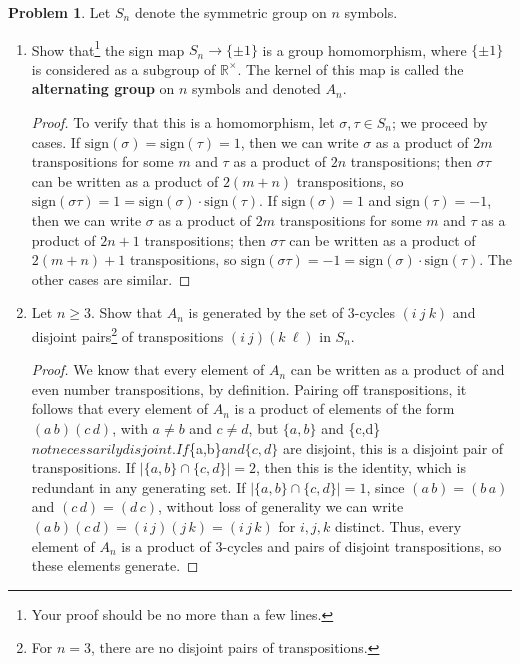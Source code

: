\documentclass[11pt]{article}
\theoremstyle{definition}
\newtheorem{problem}{Problem}
\begin{document}
\begin{problem} 
Let $S_n$ denote the symmetric group on $n$ symbols.
\begin{enumerate}[(3.1)]
\item Show that\footnote{Your proof should be no more than a few lines.} the sign map $S_n \to \{\pm 1\}$ is a group homomorphism, where $\{\pm 1\}$ is considered as a subgroup of $\mathbb{R}^\times$. The kernel of this map is called the \textbf{alternating group} on $n$ symbols and denoted $A_n$.

\begin{proof} To verify that this is a homomorphism, let $\sigma, \tau\in S_n$; we proceed by cases. If $\mathrm{sign}(\sigma) = \mathrm{sign}(\tau)= 1$, then we can write $\sigma$ as a product of $2m$ transpositions for some $m$ and $\tau$ as a product of $2n$ transpositions; then $\sigma \tau$ can be written as a product of $2(m+n)$ transpositions, so $\mathrm{sign}(\sigma\tau) = 1 = \mathrm{sign}(\sigma) \cdot \mathrm{sign}(\tau)$. If $\mathrm{sign}(\sigma) = 1$ and $\mathrm{sign}(\tau)=-1$, then  we can write $\sigma$ as a product of $2m$ transpositions for some $m$ and $\tau$ as a product of $2n+1$ transpositions; then $\sigma \tau$ can be written as a product of $2(m+n)+1$ transpositions, so $\mathrm{sign}(\sigma\tau) = -1 = \mathrm{sign}(\sigma) \cdot \mathrm{sign}(\tau)$. The other cases are similar.
\end{proof}




\item Let $n\geq 3$. Show that $A_n$ is generated by the set of $3$-cycles $(i \ j\ k)$ and disjoint pairs\footnote{For $n=3$, there are no disjoint pairs of transpositions.} of transpositions $(i \ j) (k \ \ell)$ in $S_n$. 

\begin{proof} 
We know that every element of $A_n$ can be written as a product of and even number transpositions, by definition. Pairing off transpositions, it follows that every element of $A_n$ is a product of elements of the form $(a\, b)(c\, d)$, with $a\neq b$ and $c\neq d$, but $\{a,b\}$ and \{c,d\}$ not necessarily disjoint. If $\{a,b\}$ and \{c,d\}$ are disjoint, this is a disjoint pair of transpositions. If $|\{a,b\} \cap \{c,d\}|=2$, then this is the identity, which is redundant in any generating set. If $|\{a,b\} \cap \{c,d\}|=1$, since $(a\, b) =(b\, a)$ and $(c\, d) = (d\, c)$, without loss of generality we can write $(a\, b)(c\, d) = (i\, j)(j \, k) = (i\, j\, k)$ for $i,j,k$ distinct. Thus, every element of $A_n$ is a product of $3$-cycles and pairs of disjoint transpositions, so these  elements generate.
\end{proof}

\end{enumerate}
\end{problem} 
\end{document}
